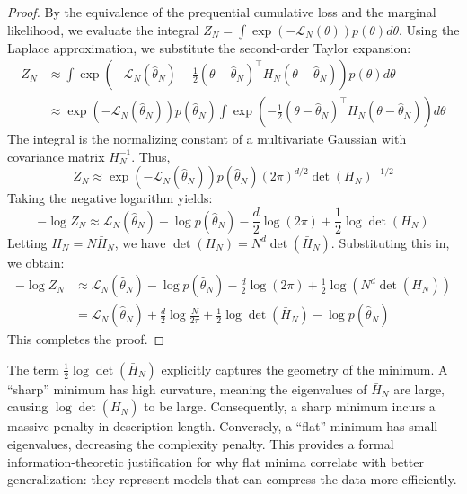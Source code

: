 \begin{proof}
By the equivalence of the prequential cumulative loss and the marginal likelihood, we evaluate the integral $Z_N = \int \exp(-\mathcal{L}_N(\theta)) p(\theta) d\theta$.
Using the Laplace approximation, we substitute the second-order Taylor expansion:
\begin{align*}
    Z_N &\approx \int \exp\left( -\mathcal{L}_N(\hat{\theta}_N) - \frac{1}{2} (\theta - \hat{\theta}_N)^\top H_N (\theta - \hat{\theta}_N) \right) p(\theta) d\theta \\
    &\approx \exp(-\mathcal{L}_N(\hat{\theta}_N)) p(\hat{\theta}_N) \int \exp\left( - \frac{1}{2} (\theta - \hat{\theta}_N)^\top H_N (\theta - \hat{\theta}_N) \right) d\theta
\end{align*}
The integral is the normalizing constant of a multivariate Gaussian with covariance matrix $H_N^{-1}$. Thus,
\begin{equation}
    Z_N \approx \exp(-\mathcal{L}_N(\hat{\theta}_N)) p(\hat{\theta}_N) (2\pi)^{d/2} \det(H_N)^{-1/2}
\end{equation}
Taking the negative logarithm yields:
\begin{equation}
    -\log Z_N \approx \mathcal{L}_N(\hat{\theta}_N) - \log p(\hat{\theta}_N) - \frac{d}{2} \log(2\pi) + \frac{1}{2} \log \det(H_N)
\end{equation}
Letting $H_N = N \bar{H}_N$, we have $\det(H_N) = N^d \det(\bar{H}_N)$. Substituting this in, we obtain:
\begin{align*}
    -\log Z_N &\approx \mathcal{L}_N(\hat{\theta}_N) - \log p(\hat{\theta}_N) - \frac{d}{2} \log(2\pi) + \frac{1}{2} \log (N^d \det(\bar{H}_N)) \\
    &= \mathcal{L}_N(\hat{\theta}_N) + \frac{d}{2} \log \frac{N}{2\pi} + \frac{1}{2} \log \det(\bar{H}_N) - \log p(\hat{\theta}_N)
\end{align*}
This completes the proof.
\end{proof}

The term $\frac{1}{2} \log \det (\bar{H}_N)$ explicitly captures the geometry of the minimum. A ``sharp'' minimum has high curvature, meaning the eigenvalues of $\bar{H}_N$ are large, causing $\log \det(\bar{H}_N)$ to be large. Consequently, a sharp minimum incurs a massive penalty in description length. Conversely, a ``flat'' minimum has small eigenvalues, decreasing the complexity penalty. This provides a formal information-theoretic justification for why flat minima correlate with better generalization: they represent models that can compress the data more efficiently.


